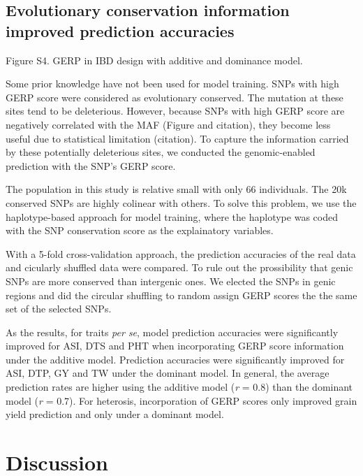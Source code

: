 \documentclass[10pt]{article}
\begin{document}
\subsection*{Evolutionary conservation information improved prediction accuracies}

Figure S4. GERP in IBD design with additive and dominance model.

Some prior knowledge have not been used for model training. 
SNPs with high GERP score were considered as evolutionary conserved. The mutation at these sites tend to be deleterious. However, because SNPs with high GERP score are negatively correlated with the MAF (Figure and citation), they become less useful due to statistical limitation (citation). To capture the information carried by these potentially deleterious sites, we conducted the genomic-enabled prediction with the SNP's GERP score. 

The population in this study is relative small with only 66 individuals. The 20k conserved SNPs are highly colinear with others. To solve this problem, we use the haplotype-based approach for model training, where the haplotype was coded with the SNP conservation score as the explainatory variables. 

With a 5-fold cross-validation approach, the prediction accuracies of the real data and cicularly shuffled data were compared. To rule out the prossibility that genic SNPs are more conserved than intergenic ones. We elected the SNPs in genic regions and did the circular shuffling to random assign GERP scores the the same set of the selected SNPs.

As the results, for traits \emph{per se}, model prediction accuracies were significantly improved for ASI, DTS and PHT when incorporating GERP score information under the additive model. Prediction accuracies were significantly improved for ASI, DTP, GY and TW under the dominant model. In general, the average prediction rates are higher using the additive model (\emph{r} = 0.8) than the dominant model (\emph{r} = 0.7). For heterosis, incorporation of GERP scores only improved grain yield prediction and only under a dominant model.  


\section*{Discussion}
\end{document}
